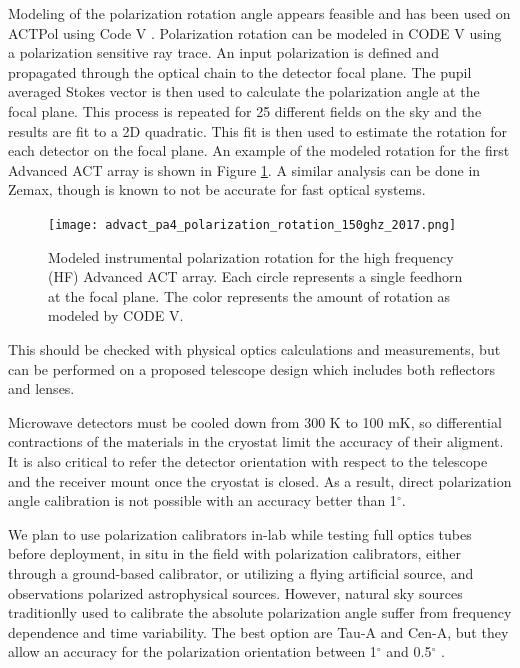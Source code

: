 Modeling of the polarization rotation angle appears feasible and has been used
on ACTPol using Code V \cite{2016arXiv160701825K}. Polarization rotation can be
modeled in CODE V using a polarization sensitive ray trace. An input
polarization is defined and propagated through the optical chain to the
detector focal plane. The pupil averaged Stokes vector is then used to
calculate the polarization angle at the focal plane. This process is repeated
for 25 different fields on the sky and the results are fit to a 2D quadratic.
This fit is then used to estimate the rotation for each detector on the focal
plane. An example of the modeled rotation for the first Advanced ACT array is
shown in Figure \ref{fig:advact_pa4_pol_rotation}. A similar analysis can be
done in Zemax, though is known to not be accurate for fast optical systems.

\begin{figure}[h!]
\begin{center}
\texttt{[image: advact\_pa4\_polarization\_rotation\_150ghz\_2017.png]}
\caption{Modeled instrumental polarization rotation for the high frequency (HF)
Advanced ACT array. Each circle represents a single feedhorn at the focal
plane. The color represents the amount of rotation as modeled by CODE V.}
\label{fig:advact_pa4_pol_rotation}
\end{center}
\end{figure}

This should be checked with physical optics calculations and measurements, but
can be performed on a proposed telescope design which includes both reflectors
and lenses.

Microwave detectors must be cooled down from 300 K to 100 mK, so differential
contractions of the materials in the cryostat limit the accuracy of their
aligment. It is also critical to refer the detector orientation with respect
to the telescope and the receiver mount once the cryostat is closed. As a
result, direct polarization angle calibration is not possible with an accuracy
better than 1$^{\circ}$.

We plan to use polarization calibrators in-lab while testing full optics tubes
before deployment, in situ in the field with polarization calibrators, either
through a ground-based calibrator, or utilizing a flying artificial source, and
observations polarized astrophysical sources. However, natural sky sources
traditionlly used to calibrate the absolute polarization angle suffer from
frequency dependence and time variability. The best option are Tau-A and Cen-A,
but they allow an accuracy for the polarization orientation between 1$^{\circ}$
and 0.5$^{\circ}$ \cite{planck16i,polarbear14,weiland11}. 

